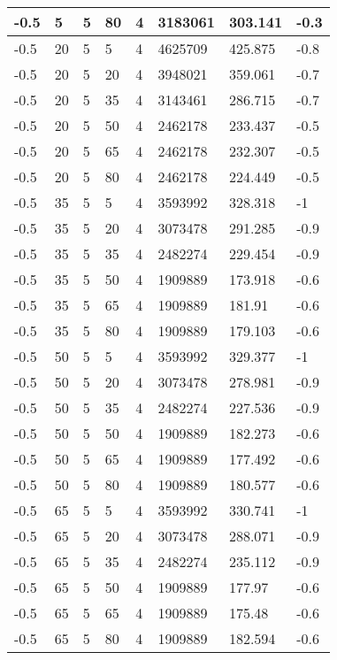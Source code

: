 \begin{longtable}{|p{1.4cm}|p{1.4cm}|p{1.4cm}|p{1.4cm}|p{1.4cm}|p{1.4cm}|p{1.4cm}|p{1.5cm}|}
        -0.5 & 5 & 5 & 80 & 4 & 3183061 & 303.141 & -0.3 \\ \hline
        -0.5 & 20 & 5 & 5 & 4 & 4625709 & 425.875 & -0.8 \\ \hline
        -0.5 & 20 & 5 & 20 & 4 & 3948021 & 359.061 & -0.7 \\ \hline
        -0.5 & 20 & 5 & 35 & 4 & 3143461 & 286.715 & -0.7 \\ \hline
        -0.5 & 20 & 5 & 50 & 4 & 2462178 & 233.437 & -0.5 \\ \hline
        -0.5 & 20 & 5 & 65 & 4 & 2462178 & 232.307 & -0.5 \\ \hline
        -0.5 & 20 & 5 & 80 & 4 & 2462178 & 224.449 & -0.5 \\ \hline
        -0.5 & 35 & 5 & 5 & 4 & 3593992 & 328.318 & -1 \\ \hline
        -0.5 & 35 & 5 & 20 & 4 & 3073478 & 291.285 & -0.9 \\ \hline
        -0.5 & 35 & 5 & 35 & 4 & 2482274 & 229.454 & -0.9 \\ \hline
        -0.5 & 35 & 5 & 50 & 4 & 1909889 & 173.918 & -0.6 \\ \hline
        -0.5 & 35 & 5 & 65 & 4 & 1909889 & 181.91 & -0.6 \\ \hline
        -0.5 & 35 & 5 & 80 & 4 & 1909889 & 179.103 & -0.6 \\ \hline
        -0.5 & 50 & 5 & 5 & 4 & 3593992 & 329.377 & -1 \\ \hline
        -0.5 & 50 & 5 & 20 & 4 & 3073478 & 278.981 & -0.9 \\ \hline
        -0.5 & 50 & 5 & 35 & 4 & 2482274 & 227.536 & -0.9 \\ \hline
        -0.5 & 50 & 5 & 50 & 4 & 1909889 & 182.273 & -0.6 \\ \hline
        -0.5 & 50 & 5 & 65 & 4 & 1909889 & 177.492 & -0.6 \\ \hline
        -0.5 & 50 & 5 & 80 & 4 & 1909889 & 180.577 & -0.6 \\ \hline
        -0.5 & 65 & 5 & 5 & 4 & 3593992 & 330.741 & -1 \\ \hline
        -0.5 & 65 & 5 & 20 & 4 & 3073478 & 288.071 & -0.9 \\ \hline
        -0.5 & 65 & 5 & 35 & 4 & 2482274 & 235.112 & -0.9 \\ \hline
        -0.5 & 65 & 5 & 50 & 4 & 1909889 & 177.97 & -0.6 \\ \hline
        -0.5 & 65 & 5 & 65 & 4 & 1909889 & 175.48 & -0.6 \\ \hline
        -0.5 & 65 & 5 & 80 & 4 & 1909889 & 182.594 & -0.6 \\ \hline

\end{longtable}

